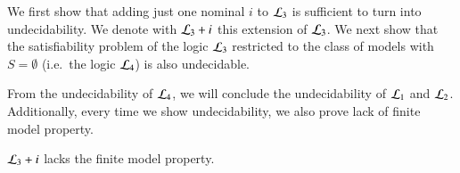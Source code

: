 We first show that adding just one nominal $i$ to $\mathcal{L}_3$ is
sufficient to turn into undecidability. We denote with $\mathcal{L}_3+i$
this extension of $\mathcal{L}_3$.
%
We next show that the satisfiability problem of the logic $\mathcal{L}_3$
restricted to the class of models with $S=\emptyset$ (i.e.\ the
logic $\mathcal{L}_4$) is also undecidable.

From the undecidability of $\mathcal{L}_4$, we will conclude the
undecidability of $\mathcal{L}_1$ and $\mathcal{L}_2$. Additionally, every time
we show undecidability, we also prove lack of finite model property.




\begin{thm}\label{thm:tlmi:inf}
$\mathcal{L}_3 + i$ lacks the finite model property.
\end{thm}

